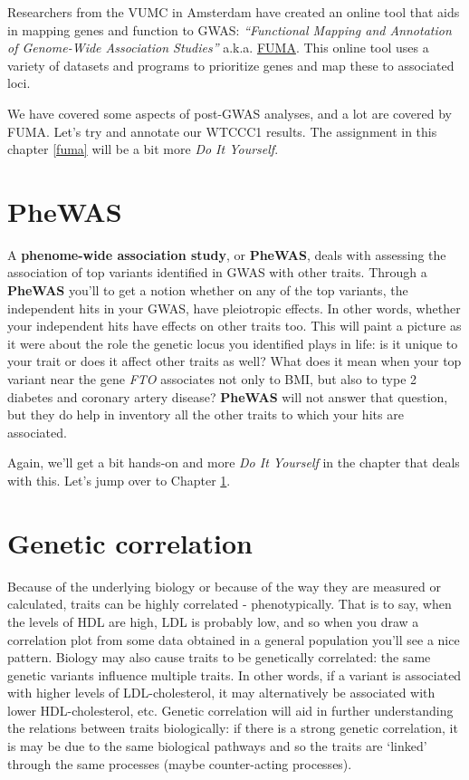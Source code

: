 \documentclass[
]{book}
\begin{document}
Researchers from the VUMC in Amsterdam have created an online tool that aids in mapping genes and function to GWAS: \emph{``Functional Mapping and Annotation of Genome-Wide Association Studies''} a.k.a. \href{https://fuma.ctglab.nl}{FUMA}. This online tool uses a variety of datasets and programs to prioritize genes and map these to associated loci.

We have covered some aspects of post-GWAS analyses, and a lot are covered by FUMA. Let's try and annotate our WTCCC1 results. The assignment in this chapter \ref{fuma} will be a bit more \emph{Do It Yourself}.

\hypertarget{phewas}{%
\section{PheWAS}\label{phewas}}

A \textbf{phenome-wide association study}, or \textbf{PheWAS}, deals with assessing the association of top variants identified in GWAS with other traits. Through a \textbf{PheWAS} you'll to get a notion whether on any of the top variants, the independent hits in your GWAS, have pleiotropic effects. In other words, whether your independent hits have effects on other traits too. This will paint a picture as it were about the role the genetic locus you identified plays in life: is it unique to your trait or does it affect other traits as well? What does it mean when your top variant near the gene \emph{FTO} associates not only to BMI, but also to type 2 diabetes and coronary artery disease? \textbf{PheWAS} will not answer that question, but they do help in inventory all the other traits to which your hits are associated.

Again, we'll get a bit hands-on and more \emph{Do It Yourself} in the chapter that deals with this. Let's jump over to Chapter \ref{phewas}.

\hypertarget{genetic-correlation}{%
\section{Genetic correlation}\label{genetic-correlation}}

Because of the underlying biology or because of the way they are measured or calculated, traits can be highly correlated - phenotypically. That is to say, when the levels of HDL are high, LDL is probably low, and so when you draw a correlation plot from some data obtained in a general population you'll see a nice pattern. Biology may also cause traits to be genetically correlated: the same genetic variants influence multiple traits. In other words, if a variant is associated with higher levels of LDL-cholesterol, it may alternatively be associated with lower HDL-cholesterol, etc. Genetic correlation will aid in further understanding the relations between traits biologically: if there is a strong genetic correlation, it is may be due to the same biological pathways and so the traits are `linked' through the same processes (maybe counter-acting processes).
\end{document}
